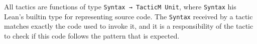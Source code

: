 All tactics are functions of type \texttt{Syntax → TacticM Unit}, where \texttt{Syntax}
his Lean's builtin type for representing source code. The \texttt{Syntax} received by
a tactic matches exactly the code used to invoke it, and it is a responsibility of the
tactic to check if this code follows the pattern that is expected.

